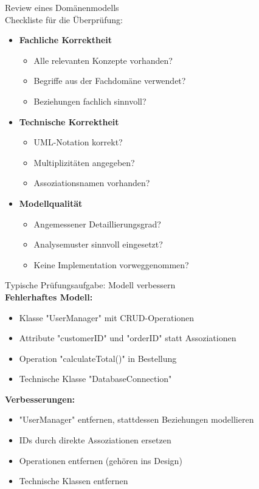 \begin{KR}{Review eines Domänenmodells}\\
Checkliste für die Überprüfung:
\begin{itemize}
    \item \textbf{Fachliche Korrektheit}
    \begin{itemize}
        \item Alle relevanten Konzepte vorhanden?
        \item Begriffe aus der Fachdomäne verwendet?
        \item Beziehungen fachlich sinnvoll?
    \end{itemize}
    
    \item \textbf{Technische Korrektheit}
    \begin{itemize}
        \item UML-Notation korrekt?
        \item Multiplizitäten angegeben?
        \item Assoziationsnamen vorhanden?
    \end{itemize}
    
    \item \textbf{Modellqualität}
    \begin{itemize}
        \item Angemessener Detaillierungsgrad?
        \item Analysemuster sinnvoll eingesetzt?
        \item Keine Implementation vorweggenommen?
    \end{itemize}
\end{itemize}
\end{KR}

\begin{example2}{Typische Prüfungsaufgabe: Modell verbessern}\\
\textbf{Fehlerhaftes Modell:}
\begin{itemize}
    \item Klasse "UserManager" mit CRUD-Operationen
    \item Attribute "customerID" und "orderID" statt Assoziationen
    \item Operation "calculateTotal()" in Bestellung
    \item Technische Klasse "DatabaseConnection"
\end{itemize}

\textbf{Verbesserungen:}
\begin{itemize}
    \item "UserManager" entfernen, stattdessen Beziehungen modellieren
    \item IDs durch direkte Assoziationen ersetzen
    \item Operationen entfernen (gehören ins Design)
    \item Technische Klassen entfernen
\end{itemize}
\end{example2}

